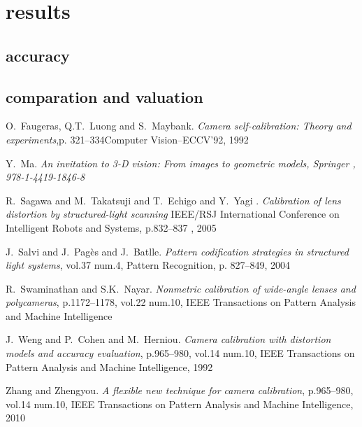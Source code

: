\documentclass[journal,final,a4paper,twoside]{PS}
\begin{document}
\section{results}
\label{sec:results}
\subsection{accuracy}
\subsection{comparation and valuation}




%

\begin{thebibliography}{1}
O.~Faugeras, Q.T.~Luong and S.~Maybank. \emph{Camera self-calibration: Theory and experiments},p. 321--334Computer Vision--ECCV'92, 1992

Y.~Ma. \emph{{An invitation to 3-D vision: From images to geometric models}, {Springer} , {978-1-4419-1846-8}}

R.~Sagawa and M.~Takatsuji and T.~Echigo and Y.~Yagi . \emph{Calibration of lens distortion by structured-light scanning} IEEE/RSJ International Conference on Intelligent Robots and Systems, p.832--837 , 2005

J.~Salvi and J.~Pag{\`e}s and J.~Batlle. \emph{Pattern codification strategies in structured light systems}, vol.37 num.4, Pattern Recognition, p. 827--849, 2004

R.~Swaminathan and S.K.~Nayar. \emph{Nonmetric calibration of wide-angle lenses and polycameras}, p.1172--1178, vol.22 num.10, IEEE Transactions on Pattern Analysis and Machine Intelligence

J.~Weng and P.~Cohen and M.~Herniou. \emph{Camera calibration with distortion models and accuracy evaluation}, p.965--980, vol.14 num.10, IEEE Transactions on Pattern Analysis and Machine Intelligence, 1992

Zhang and Zhengyou. \emph{A flexible new technique for camera calibration}, p.965--980, vol.14 num.10, IEEE Transactions on Pattern Analysis and Machine Intelligence, 2010



\end{thebibliography}
\end{document}
